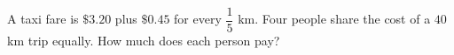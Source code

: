 A taxi fare is $\$3.20$ plus $\$0.45$ for every $\dfrac{1}{5}$ km. Four people share the cost of a $40$ km trip equally. How much does each person pay?
